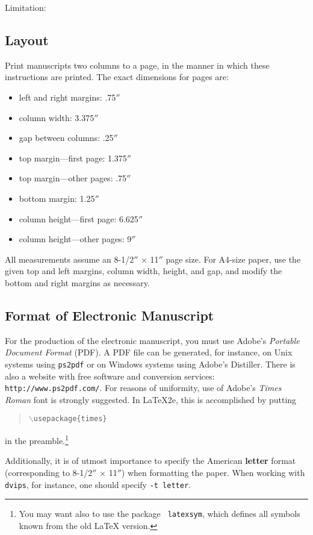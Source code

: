 \documentclass{article}
\theoremstyle{definition}
\begin{document}
Limitation: 

\subsection{Layout}

Print manuscripts two columns to a page, in the manner in which these
instructions are printed. The exact dimensions for pages are:
\begin{itemize}
\item left and right margins: .75$''$
\item column width: 3.375$''$
\item gap between columns: .25$''$
\item top margin---first page: 1.375$''$
\item top margin---other pages: .75$''$
\item bottom margin: 1.25$''$
\item column height---first page: 6.625$''$
\item column height---other pages: 9$''$
\end{itemize}

All measurements assume an 8-1/2$''$ $\times$ 11$''$ page size. For
A4-size paper, use the given top and left margins, column width,
height, and gap, and modify the bottom and right margins as necessary.

\subsection{Format of Electronic Manuscript}

For the production of the electronic manuscript, you must use Adobe's
{\em Portable Document Format} (PDF). A PDF file can be generated, for
instance, on Unix systems using {\tt ps2pdf} or on Windows systems
using Adobe's Distiller. There is also a website with free software
and conversion services: {\tt http://www.ps2pdf.com/}. For reasons of
uniformity, use of Adobe's {\em Times Roman} font is strongly suggested. In
\LaTeX2e{}, this is accomplished by putting
\begin{quote} 
\mbox{\tt $\backslash$usepackage\{times\}}
\end{quote}
in the preamble.\footnote{You may want also to use the package {\tt
latexsym}, which defines all symbols known from the old \LaTeX{}
version.}
  
Additionally, it is of utmost importance to specify the American {\bf
letter} format (corresponding to 8-1/2$''$ $\times$ 11$''$) when
formatting the paper. When working with {\tt dvips}, for instance, one
should specify {\tt -t letter}.
\end{document}
